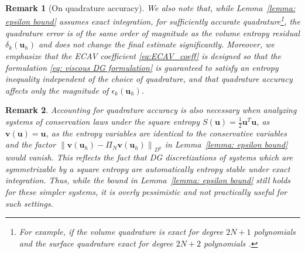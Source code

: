 \documentclass{elsarticle}
\theoremstyle{definition}
\theoremstyle{plain}
\theoremstyle{plain}
\newcommand{\nor}[1]{\left\| #1 \right\|} %
\newcommand{\LRa}[1]{\left\langle #1 \right\rangle} %
\newcommand{\reftwo}[1]{{\color{blue}#1}}
\renewcommand{\reftwo}[1]{#1}
\newtheorem{remark}{Remark}
\begin{document}
\begin{remark}[On quadrature accuracy]
We also note that, while Lemma~\ref{lemma: epsilon bound} assumes exact integration, for sufficiently accurate quadrature\footnote{For example, if the volume quadrature is exact for degree $2N+1$ polynomials and the surface quadrature exact for degree $2N+2$ polynomials \cite{chan2025artificial}.}, the quadrature error is of the same order of magnitude as the volume entropy residual $\delta_k(\bm{u}_h)$ and does not change the final estimate significantly. Moreover, we emphasize that the ECAV coefficient \eqref{eq:ECAV_coeff} is designed so that the formulation \eqref{eq: viscous DG formulation} is guaranteed to satisfy an entropy inequality independent of the choice of quadrature, and that quadrature accuracy affects only the magnitude of $\epsilon_k(\bm{u}_h)$. 
\end{remark}
    

\begin{remark}
Accounting for quadrature accuracy is also necessary when analyzing systems of conservation laws under the square entropy $S(\bm{u}) = \frac{1}{2}\bm{u}^T\bm{u}$, as $\bm{v}(\bm{u}) = \bm{u}$, as the entropy variables are identical to the conservative variables and the factor $\nor{\bm{v}(\bm{u}_h) - \Pi_N\bm{v}(\bm{u}_h)}_{D^k}$ in Lemma~\ref{lemma: epsilon bound} would vanish. This reflects the fact that DG discretizations of systems which are symmetrizable by a square entropy are automatically entropy stable under exact integration. Thus, while the bound in Lemma~\ref{lemma: epsilon bound} still holds for these simpler systems, it is overly pessimistic and not practically useful for such settings. 
\end{remark}
\end{document}
